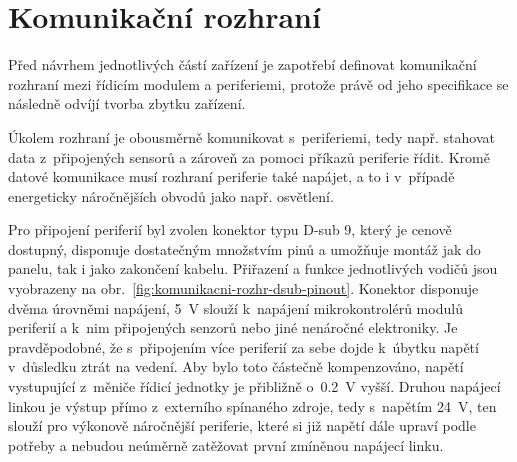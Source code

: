 \section{Komunikační rozhraní}
\label{sec:komunikacni-rozhrani}
    Před návrhem jednotlivých částí zařízení je zapotřebí definovat komunikační rozhraní mezi řídicím modulem a periferiemi, protože právě od jeho specifikace se následně odvíjí tvorba zbytku zařízení. 

    Úkolem rozhraní je obousměrně komunikovat s~periferiemi, tedy např. stahovat data z~připojených sensorů a zároveň za pomoci příkazů periferie řídit. Kromě datové komunikace musí rozhraní periferie také napájet, a to i v~případě energeticky náročnějších obvodů jako např. osvětlení. 

    Pro připojení periferií byl zvolen konektor typu D-sub 9, který je cenově dostupný, disponuje dostatečným množstvím pinů a umožňuje montáž jak do panelu, tak i jako zakončení kabelu. Přiřazení a funkce jednotlivých vodičů jsou vyobrazeny na obr.~\ref{fig:komunikacni-rozhr-dsub-pinout}. Konektor disponuje dvěma úrovněmi napájení, \qty{5}{V} slouží k~napájení mikrokontrolérů modulů periferií a k~nim připojených senzorů nebo jiné nenáročné elektroniky. Je pravděpodobné, že s~připojením více periferií za sebe dojde k~úbytku napětí v~důsledku ztrát na vedení. Aby bylo toto částečně kompenzováno, napětí vystupující z~měniče řídicí jednotky je přibližně o~\qty{0.2}{V} vyšší. Druhou napájecí linkou je výstup přímo z~externího spínaného zdroje, tedy s~napětím \qty{24}{V}, ten slouží pro výkonově náročnější periferie, které si již napětí dále upraví podle potřeby a nebudou neúměrně zatěžovat první zmíněnou napájecí linku.

